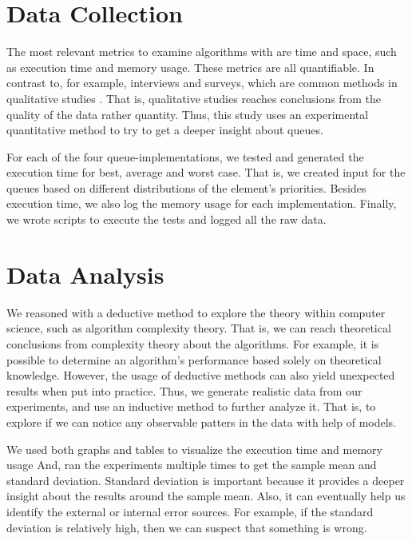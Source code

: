 \documentclass[a4paper,11pt]{kth-mag}
\newcommand*{\skippara}{\par\vspace{\baselineskip} \noindent}
\begin{document}
\section{Data Collection}
The most relevant metrics to examine algorithms with are time and space, such as execution time and memory usage.
These metrics are all quantifiable.
In contrast to, for example, interviews and surveys, which are common methods in qualitative studies \cite{Omexperi69:online, haakansson2013portal}.
That is, qualitative studies reaches conclusions from the quality of the data rather quantity.
Thus, this study uses an experimental quantitative method to try to get a deeper insight about queues.

\skippara For each of the four queue-implementations, we tested and generated the execution time for best, average and worst case.
That is, we created input for the queues based on different distributions of the element's priorities.
Besides execution time, we also log the memory usage for each implementation.
Finally, we wrote scripts to execute the tests and logged all the raw data.

\section{Data Analysis}
We reasoned with a deductive method to explore the theory within computer science, such as algorithm complexity theory.
That is, we can reach theoretical conclusions from complexity theory about the algorithms.
For example, it is possible to determine an algorithm's performance based solely on theoretical knowledge.
However, the usage of deductive methods can also yield unexpected results when put into practice.
Thus, we generate realistic data from our experiments, and use an inductive method to further analyze it.
That is, to explore if we can notice any observable patters in the data with help of models.

\skippara We used both graphs and tables to visualize the execution time and memory usage
And, ran the experiments multiple times to get the sample mean and standard deviation.
Standard deviation is important because it provides a deeper insight about the results around the sample mean.
Also, it can eventually help us identify the external or internal error sources.
For example, if the standard deviation is relatively high, then we can suspect that something is wrong.
\end{document}
